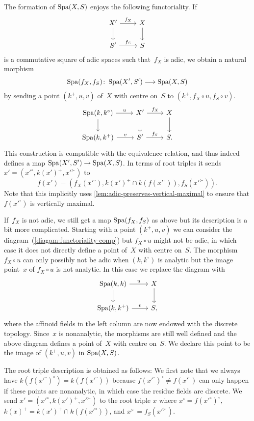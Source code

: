 The formation of $\operatorname{Spa}(X,S)$ enjoys the following functoriality.
If
    \[ 
        \begin{tikzcd}
            X'\ar[d] \ar[r,"f_X"] & X\ar[d] \\
            S'\ar[r,"f_S"] & S
        \end{tikzcd}
    \]
is a commutative square of adic spaces such that~$f_X$ is adic, we obtain a natural morphism
\[
 \operatorname{Spa}(f_X,f_S) \colon \operatorname{Spa}(X',S') \longrightarrow \operatorname{Spa}(X,S)
\]
by sending a point $(k^+,u,v)$ of~$X$ with centre on~$S$ to $(k^+,f_X \circ u,f_S \circ v)$.
\begin{equation} \label{diagam:functoriality-comp}
 \begin{tikzcd}
     \Spa(k,k^\circ)    \ar[r,"u"]  \ar[d]  & X'    \ar[r,"f_X"]    \ar[d]  & X \ar[d]  \\
     \Spa(k,k^+)        \ar[r,"v"]          & S'    \ar[r,"f_S"]            & S.
 \end{tikzcd}
\end{equation}
This construction is compatible with the equivalence relation, and thus indeed defines a map $\operatorname{Spa}(X',S') \to \operatorname{Spa}(X,S)$.
In terms of root triples it sends $x' = (x'^\circ,k(x')^+,x'^\succ)$ to
\[
    f(x') = (f_X(x'^\circ),k(x')^+ \cap k(f(x'^\circ)),f_S(x'^\succ)).
\]
Note that this implicitly uses \cref{lem:adic-preserves-vertical-maximal} to ensure that $f(x'^\circ)$ is vertically maximal.

If~$f_X$ is not adic, we still get a map $\operatorname{Spa}(f_X,f_S)$ as above but its description is a bit more complicated.
Starting with a point $(k^+,u,v)$ we can consider the diagram~(\ref{diagam:functoriality-comp}) but $f_X \circ u$ might not be adic, in which case it does not directly define a point of~$X$ with centre on~$S$.
The morphism $f_X \circ u$ can only possibly not be adic when $(k,k^\circ)$ is analytic but the image point~$x$ of $f_X \circ u$ is not analytic.
In this case we replace the diagram with
\[
    \begin{tikzcd}
        \Spa(k,k)   \ar[r,"u"]  \ar[d]  & X \ar[d]  \\
        \Spa(k,k^+) \ar[r,"v"]          & S,
    \end{tikzcd}
\]
where the affinoid fields in the left column are now endowed with the discrete topology.
Since~$x$ is nonanalytic, the morphisms are still well defined and the above diagram defines a point of~$X$ with centre on~$S$.
We declare this point to be the image of $(k^+,u,v)$ in $\operatorname{Spa}(X,S)$.

The root triple description is obtained as follows:
We first note that we always have $k(f(x'^\circ)^\circ) = k(f(x'^\circ))$ because $f(x'^\circ)^\circ \ne f(x'^\circ)$ can only happen if these points are nonanalytic, in which case the residue fields are discrete.
We send $x' = (x'^\circ,k(x')^+,x'^\succ)$ to the root triple $x$ where $x^\circ = f(x'^\circ)^\circ$, $k(x)^+ = k(x')^+ \cap k(f(x'^\circ))$, and $x^\succ = f_S(x'^\succ)$.

